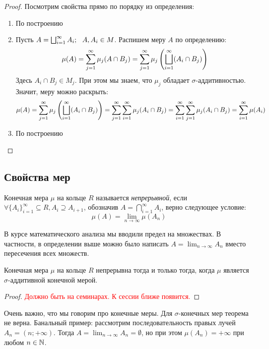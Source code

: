 \begin{proof}
	Посмотрим свойства прямо по порядку из определения:
	\begin{enumerate}
		\item По построению
		
		\item Пусть $A = \bscup_{i = 1}^\infty A_i;\ \ A, A_i \in M$. Распишем меру $A$ по определению:
		\[
			\mu(A) = \sum_{j = 1}^\infty \mu_j(A \cap B_j) = \sum_{j = 1}^\infty \mu_j\left(\bigsqcup_{i = 1}^\infty (A_i \cap B_j)\right)
		\]
		Здесь $A_i \cap B_j \in M_j$. При этом мы знаем, что $\mu_j$ обладает $\sigma$-аддитивностью. Значит, меру можно раскрыть:
		\[
			\mu(A) = \sum_{j = 1}^\infty \mu_j\left(\bigsqcup_{i = 1}^\infty (A_i \cap B_j)\right) = \sum_{j = 1}^\infty \sum_{i = 1}^\infty \mu_j(A_i \cap B_j) = \sum_{i = 1}^\infty \sum_{j = 1}^\infty \mu_j(A_i \cap B_j) = \sum_{i = 1}^\infty \mu(A_i)
		\]
		
		\item По построению
	\end{enumerate}
\end{proof}

\subsection*{Свойства мер}

\begin{definition}
	Конечная мера $\mu$ на кольце $R$ называется \textit{непрерывной}, если $\forall \{A_i\}_{i = 1}^\infty \subseteq R, A_i \supseteq A_{i + 1}$, обозначив $A = \bigcap_{i = 1}^\infty A_i$, верно следующее условие:
	\[
		\mu(A) = \lim_{n \to \infty} \mu(A_n)
	\]
\end{definition}

\begin{note}
	В курсе математического анализа мы вводили предел на множествах. В частности, в определении выше можно было написать $A = \lim_{n \to \infty} A_n$ вместо пересечения всех множеств.
\end{note}

\begin{theorem}
	Конечная мера $\mu$ на кольце $R$ непрерывна тогда и только тогда, когда $\mu$ является $\sigma$-аддитивной конечной мерой.
\end{theorem}

\begin{proof}
	\textcolor{red}{Должно быть на семинарах. К сессии ближе появится.}
\end{proof}

\begin{note}
	Очень важно, что мы говорим про конечные меры. Для $\sigma$-конечных мер теорема не верна. Банальный пример: рассмотрим последовательность правых лучей $A_n = (n; +\infty)$. Тогда $A = \lim_{n \to \infty} A_n = \emptyset$, но при этом $\mu(A_n) = +\infty$ при любом $n \in \mathbb{N}$.
\end{note}